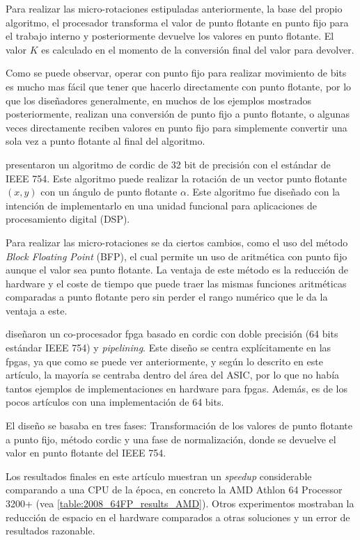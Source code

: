 Para realizar las micro-rotaciones estipuladas anteriormente, la base del propio algoritmo, el procesador transforma el valor de punto flotante en punto fijo para el trabajo interno y posteriormente devuelve los valores en punto flotante. El valor $K$ es calculado en el momento de la conversión final del valor para devolver.

Como se puede observar, operar con punto fijo para realizar movimiento de bits es mucho mas fácil que tener que hacerlo directamente con punto flotante, por lo que los diseñadores generalmente, en muchos de los ejemplos mostrados posteriormente, realizan una conversión de punto fijo a punto flotante, o algunas veces directamente reciben valores en punto fijo para simplemente convertir una sola vez a punto flotante al final del algoritmo.

\cite{hekstra_floating_1993} presentaron un algoritmo de \gls{cordic} de 32 bit de precisión con el estándar de IEEE 754. Este algoritmo puede realizar la rotación de un vector punto flotante $(x,y)$ con un ángulo de punto flotante $\alpha$. Este algoritmo fue diseñado con la intención de implementarlo en una unidad funcional para aplicaciones de procesamiento digital (DSP).

Para realizar las micro-rotaciones se da ciertos cambios, como el uso del método \textit{Block Floating Point} (BFP), el cual permite un uso de aritmética con punto fijo aunque el valor sea punto flotante. La ventaja de este método es la reducción de hardware y el coste de tiempo que puede traer las mismas funciones aritméticas comparadas a punto flotante pero sin perder el rango numérico que le da la ventaja a este.

\cite{zhou_double_2008} diseñaron un co-procesador \gls{fpga} basado en \gls{cordic} con doble precisión (64 bits estándar IEEE 754) y \textit{pipelining}. Este diseño se centra explícitamente en las \gls{fpga}s, ya que como se puede ver anteriormente, y según lo descrito en este artículo, la mayoría se centraba dentro del área del ASIC, por lo que no había tantos ejemplos de implementaciones en hardware para \gls{fpga}s. Además, es de los pocos artículos con una implementación de 64 bits.

El diseño se basaba en tres fases: Transformación de los valores de punto flotante a punto fijo, método \gls{cordic} y una fase de normalización, donde se devuelve el valor en punto flotante del IEEE 754.

Los resultados finales en este artículo muestran un \textit{speedup} considerable comparando a una CPU de la época, en concreto la AMD Athlon 64 Processor 3200+ (vea \ref{table:2008_64FP_results_AMD}). Otros experimentos mostraban la reducción de espacio en el hardware comparados a otras soluciones y un error de resultados razonable.

